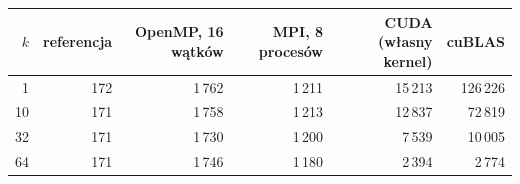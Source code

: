 \begin{tabular}{rrrrrr}
\toprule
$k$ & referencja & OpenMP, 16 wątków & MPI, 8 procesów & CUDA (własny kernel) & cuBLAS \\
\midrule
1 & 172 & 1\,762 & 1\,211 & 15\,213 & 126\,226 \\
10 & 171 & 1\,758 & 1\,213 & 12\,837 & 72\,819 \\
32 & 171 & 1\,730 & 1\,200 & 7\,539 & 10\,005 \\
64 & 171 & 1\,746 & 1\,180 & 2\,394 & 2\,774 \\
\bottomrule
\end{tabular}
